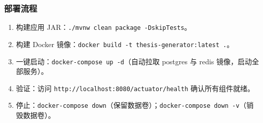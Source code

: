 \subsubsection{部署流程}

\begin{enumerate}
    \item 构建应用 JAR：\texttt{./mvnw clean package -DskipTests}。
    \item 构建 Docker 镜像：\texttt{docker build -t thesis-generator:latest .}。
    \item 一键启动：\texttt{docker-compose up -d}（自动拉取 postgres 与 redis 镜像，启动全部服务）。
    \item 验证：访问 \texttt{http://localhost:8080/actuator/health} 确认所有组件就绪。
    \item 停止：\texttt{docker-compose down}（保留数据卷）；\texttt{docker-compose down -v}（销毁数据卷）。
\end{enumerate}
